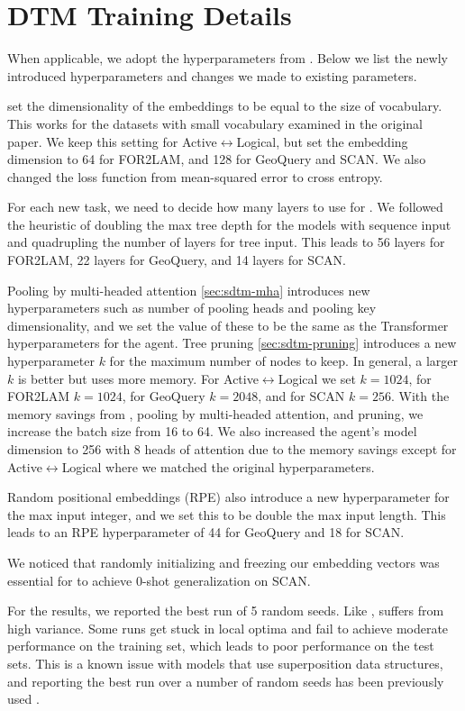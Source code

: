 \section{DTM Training Details} \label{sec:sdtm-dtm-training}
When applicable, we adopt the hyperparameters from \citet{pmlr-v202-soulos23a}. Below we list the newly introduced hyperparameters and changes we made to existing parameters.

\citet{pmlr-v202-soulos23a} set the dimensionality of the embeddings to be equal to the size of vocabulary. This works for the datasets with small vocabulary examined in the original paper. We keep this setting for Active$\leftrightarrow$Logical, but set the embedding dimension to 64 for FOR2LAM, and 128 for GeoQuery and SCAN. We also changed the loss function from mean-squared error to cross entropy.

For each new task, we need to decide how many layers to use for \sdtm. We followed the heuristic of doubling the max tree depth for the models with sequence input and quadrupling the number of layers for tree input. This leads to 56 layers for FOR2LAM, 22 layers for GeoQuery, and 14 layers for SCAN.

Pooling by multi-headed attention \ref{sec:sdtm-mha} introduces new hyperparameters such as number of pooling heads and pooling key dimensionality, and we set the value of these to be the same as the Transformer hyperparameters for the agent. Tree pruning \ref{sec:sdtm-pruning} introduces a new hyperparameter $k$ for the maximum number of nodes to keep. In general, a larger $k$ is better but uses more memory. For Active$\leftrightarrow$Logical we set $k=1024$, for FOR2LAM $k=1024$, for GeoQuery $k=2048$, and for SCAN $k=256$. With the memory savings from \abvrepname, pooling by multi-headed attention, and pruning, we increase the batch size from 16 to 64. We also increased the agent's model dimension to 256 with 8 heads of attention due to the memory savings except for Active$\leftrightarrow$Logical where we matched the original hyperparameters.

Random positional embeddings (RPE) also introduce a new hyperparameter for the max input integer, and we set this to be double the max input length. This leads to an RPE hyperparameter of 44 for GeoQuery and 18 for SCAN.

We noticed that randomly initializing and freezing our embedding vectors was essential for \sdtm to achieve 0-shot generalization on SCAN.

For the results, we reported the best run of 5 random seeds. Like \dtm, \sdtm suffers from high variance. Some runs get stuck in local optima and fail to achieve moderate performance on the training set, which leads to poor performance on the test sets. This is a known issue with models that use superposition data structures, and reporting the best run over a number of random seeds has been previously used \citep{yogatama2018memory, dusell2024stack}.

